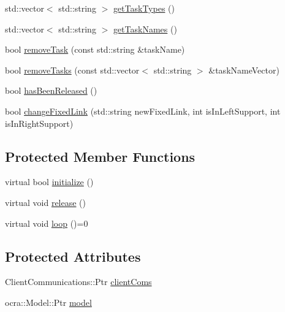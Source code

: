 \begin{DoxyCompactItemize}
std\+::vector$<$ std\+::string $>$ \hyperlink{classocra__recipes_1_1ControllerClient_a53b0b53fc4c46f195c9f6dd2d1a6506c}{get\+Task\+Types} ()
\item 
std\+::vector$<$ std\+::string $>$ \hyperlink{classocra__recipes_1_1ControllerClient_a96ece5fcbcdffcd43c93905ffce5f54a}{get\+Task\+Names} ()
\item 
bool \hyperlink{classocra__recipes_1_1ControllerClient_a6666247713cb0e1db55b51b9a5ae49a1}{remove\+Task} (const std\+::string \&task\+Name)
\item 
bool \hyperlink{classocra__recipes_1_1ControllerClient_a7e72d409c511f201201292e8c123e771}{remove\+Tasks} (const std\+::vector$<$ std\+::string $>$ \&task\+Name\+Vector)
\item 
bool \hyperlink{classocra__recipes_1_1ControllerClient_a8c83005b1be831bc230d5a441f88980d}{has\+Been\+Released} ()
\item 
bool \hyperlink{classocra__recipes_1_1ControllerClient_ac4619242e809fa326f25f073d18feb50}{change\+Fixed\+Link} (std\+::string new\+Fixed\+Link, int is\+In\+Left\+Support, int is\+In\+Right\+Support)
\end{DoxyCompactItemize}
\subsection*{Protected Member Functions}
\begin{DoxyCompactItemize}
\item 
virtual bool \hyperlink{classocra__recipes_1_1ControllerClient_a8ac06cc5d7d6b0e078e1cb377a998c25}{initialize} ()
\item 
virtual void \hyperlink{classocra__recipes_1_1ControllerClient_a181c868d0165b06b9b10a9e40127bc69}{release} ()
\item 
virtual void \hyperlink{classocra__recipes_1_1ControllerClient_ac6d28be8e314dd2a034cfcb512e29ee3}{loop} ()=0
\end{DoxyCompactItemize}
\subsection*{Protected Attributes}
\begin{DoxyCompactItemize}
\item 
Client\+Communications\+::\+Ptr \hyperlink{classocra__recipes_1_1ControllerClient_aced7fa4d435e58cc2832abdbad1e4cbd}{client\+Coms}
\item 
ocra\+::\+Model\+::\+Ptr \hyperlink{classocra__recipes_1_1ControllerClient_a7eab32e91df97360c4de86f968a943e6}{model}
\end{DoxyCompactItemize}


